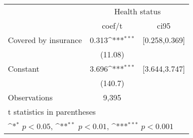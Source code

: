 {
\def\sym#1{\ifmmode^{#1}\else\(^{#1}\)\fi}
\begin{tabular}{l*{1}{cc}}
\hline\hline
                &\multicolumn{2}{c}{Health status}\\
                &   coef/t         &     ci95\\
\hline
Covered by insurance&    0.313\sym{***}&[0.258,0.369]\\
                &  (11.08)         &         \\
Constant        &    3.696\sym{***}&[3.644,3.747]\\
                &  (140.7)         &         \\
\hline
Observations    &    9,395         &         \\
\hline\hline
\multicolumn{3}{l}{\footnotesize t statistics in parentheses}\\
\multicolumn{3}{l}{\footnotesize \sym{*} \(p<0.05\), \sym{**} \(p<0.01\), \sym{***} \(p<0.001\)}\\
\end{tabular}
}
